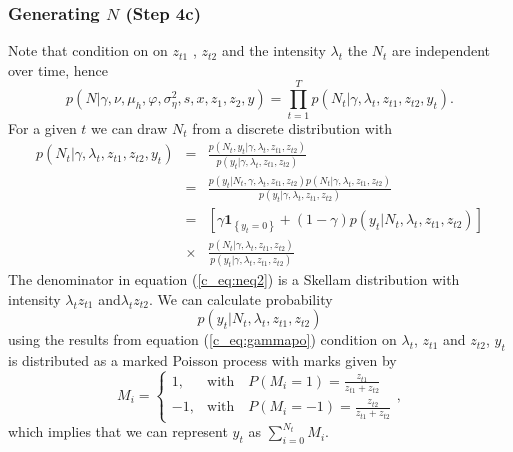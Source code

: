 \documentclass[12pt]{article}
\newcommand\mathbbm[1]{\mathbf{#1}}
\begin{document}
\subsubsection*{Generating $N$ (Step 4c) }

Note that condition on  on $z_{t1}$ , $z_{t2}$
and the intensity $\lambda_t$  the $N_t$ are independent over time, hence
\begin{equation}
p( N| \gamma, \nu,\mu_{h} ,\varphi,\sigma^{2}_{\eta},s,x ,z_{1} ,z_{2},y)= \prod \limits_{t=1}^{T}p( N_t | \gamma, \lambda_t ,z_{t1} ,z_{t2}, y_t ) .
\end{equation}
For a given $t$ we can draw $N_t $ from a discrete distribution with  
 \begin{eqnarray}
p( N_t  | \gamma, \lambda_t ,z_{t1} ,z_{t2}, y_t ) &=& \frac{p( N_t, y_t  | \gamma, \lambda_t ,z_{t1} ,z_{t2})}{p(y_t | \gamma, \lambda_t ,z_{t1} ,z_{t2}) }  \nonumber \\
 &=& \frac{p( y_t | N_t, \gamma, \lambda_t ,z_{t1} ,z_{t2})p( N_t| \gamma, \lambda_t ,z_{t1} ,z_{t2}) }{p(y_t|  \gamma, \lambda_t ,z_{t1} ,z_{t2})} \nonumber \\
 &=& \left[ \gamma \mathbbm{1}_{\left\{y_t=0 \right\}} +(1-\gamma) p\left( y_t |N_t , \lambda_t ,z_{t1} ,z_{t2}\right) \right] \nonumber \\
 &\times &\frac{p( N_t| \gamma, \lambda_t ,z_{t1} ,z_{t2}) }{p(y_t|  \gamma, \lambda_t ,z_{t1} ,z_{t2})} 
 \label{c_eq:neq2}
 \end{eqnarray}
 The denominator in equation (\ref{c_eq:neq2}) is a Skellam  distribution  with intensity $\lambda_{t} z_{t1}$ and$\lambda_{t} z_{t2}$. We can calculate  probability 
\begin{equation}
 p\left( y_t |N_t , \lambda_t ,z_{t1} ,z_{t2}\right) 
\end{equation} 
using the results from equation (\ref{c_eq:gammapo})
condition on $\lambda_t$, $z_{t1}$ and $z_{t2}$, $y_t$ is distributed as a marked Poisson process with marks given by 
\begin{equation}
M_i =\begin{cases}
    1, & \text{with} \quad P(M_i = 1)= \frac{z_{t1} }{z_{t1}+z_{t2} } \\
    -1, & \text{with} \quad P(M_i = -1)= \frac{z_{t2} }{z_{t1}+z_{t2} } 
  \end{cases},
\end{equation}
which implies that we can represent $y_t$ as $\sum \limits_{i=0}^{N_t} M_i $.  
\end{document}
